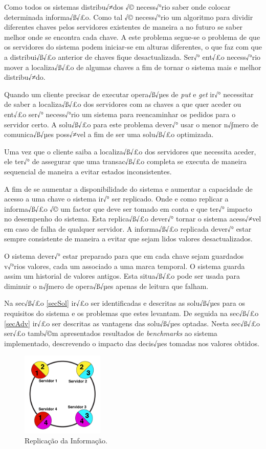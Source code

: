 \documentclass[times, 10pt,twocolumn]{article}
\begin{document}
Como todos os sistemas distribu√≠dos √© necess√°rio saber onde colocar determinada informa√ß√£o. Como tal √© necess√°rio um algoritmo para dividir diferentes chaves pelos servidores existentes de maneira a no futuro se saber melhor onde se encontra cada chave. A este problema segue-se o problema de que os servidores do sistema podem iniciar-se em alturas diferentes, o que faz com que a distribui√ß√£o anterior de chaves fique desactualizada. Ser√° ent√£o necess√°rio mover a localiza√ß√£o de algumas chaves a fim de tornar o sistema mais e melhor distribu√≠do.

Quando um cliente precisar de executar opera√ß√µes de \emph{put} e \emph{get} ir√° necessitar de saber a localiza√ß√£o dos servidores com as chaves a que quer aceder ou ent√£o ser√° necess√°rio um sistema para reencaminhar os pedidos para o servidor certo. A solu√ß√£o para este problema dever√° usar o menor n√∫mero de comunica√ß√µes poss√≠vel a fim de ser uma solu√ß√£o optimizada.

Uma vez que o cliente saiba a localiza√ß√£o dos servidores que necessita aceder, ele ter√° de assegurar que uma transac√ß√£o completa se executa de maneira sequencial de maneira a evitar estados inconsistentes.

A fim de se aumentar a disponibilidade do sistema e aumentar a capacidade de acesso a uma chave o sistema ir√° ser replicado. Onde e como replicar a informa√ß√£o √© um factor que deve ser tomado em conta e que ter√° impacto no desempenho do sistema. Esta replica√ß√£o dever√° tornar o sistema acess√≠vel em caso de falha de qualquer servidor. A informa√ß√£o replicada dever√° estar sempre consistente de maneira a evitar que sejam lidos valores desactualizados.

O sistema dever√° estar preparado para que em cada chave sejam guardados v√°rios valores, cada um associado a uma marca temporal. O sistema guarda assim um historial de valores antigos. Esta situa√ß√£o pode ser usada para diminuir o n√∫mero de opera√ß√µes apenas de leitura que falham.

Na sec√ß√£o \ref{secSol} ir√£o ser identificadas e descritas as solu√ß√µes para os requisitos do sistema e os problemas que estes levantam. De seguida na sec√ß√£o \ref{secAdv} ir√£o ser descritas as vantagens das solu√ß√µes optadas. Nesta sec√ß√£o ser√£o tamb√©m apresentados resultados de \emph{benchmarks} ao sistema implementado, descrevendo o impacto das decis√µes tomadas nos valores obtidos.

\begin{figure}[h]
\centering
	 \includegraphics[width=0.35\textwidth]{replication}
   \caption{Replicação da Informação.}
\end{figure}
\end{document}
